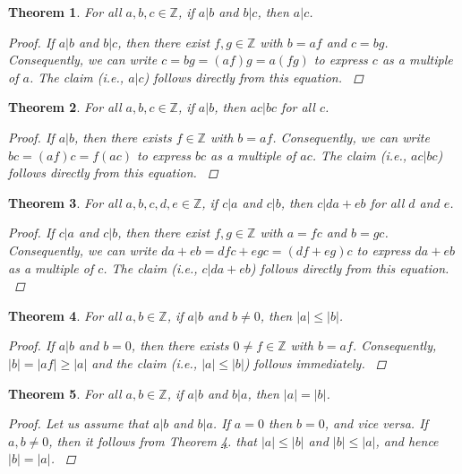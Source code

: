 \documentclass{book}
\newcommand{\ZZZ}{\ensuremath{\mathbb{Z}}}
\newtheorem{theo}{Theorem}
\begin{document}
\begin{theo}
For all $a,b,c\in\ZZZ$, if $a|b$ and $b|c$, then $a|c$.
\begin{proof}
If $a|b$ and $b|c$, then there exist $f,g\in\ZZZ$ with $b=af$ and $c=bg$. Consequently, we can write $c=bg= \left(af\right)g = a\left(fg\right)$ to express $c$ as a multiple of $a$. The claim (i.e., $a|c$) follows directly from this equation.
\cite{Oppliger:2011:CC:2049860}
\end{proof}
\end{theo}

\begin{theo}
For all $a,b,c\in\ZZZ$, if $a|b$, then $ac|bc$ for all $c$.
\begin{proof}
If $a|b$, then there exists $f\in\ZZZ$ with $b=af$. Consequently, we can write $bc=\left(af\right)c=f\left(ac\right)$ to express $bc$ as a multiple of $ac$. The claim (i.e., $ac|bc$) follows directly from this equation.
\cite{Oppliger:2011:CC:2049860}
\end{proof}
\end{theo}

\begin{theo}
For all $a,b,c,d,e\in\ZZZ$, if $c|a$ and $c|b$, then $c|da+eb$ for all $d$ and $e$.
\begin{proof}
If $c|a$ and $c|b$, then there exist $f,g\in\ZZZ$ with $a=fc$ and $b=gc$. Consequently, we can write $da+eb=dfc+egc=\left(df+eg\right)c$ to express $da+eb$ as a multiple of $c$. The claim (i.e., $c|da+eb$) follows directly from this equation.
\cite{Oppliger:2011:CC:2049860}
\end{proof}
\end{theo}

\begin{theo}
\label{theo4}
For all $a,b\in\ZZZ$, if $a|b$ and $b\neq0$, then $\left|a\right|\leq\left|b\right|$.
\begin{proof}
If $a|b$ and $b=0$, then there exists $0\neq f\in\ZZZ$ with $b=af$. Consequently, $\left|b\right|=\left|af\right|\geq\left|a\right|$ and the claim (i.e., $\left|a\right|\leq\left|b\right|$) follows immediately.
\cite{Oppliger:2011:CC:2049860}
\end{proof}
\end{theo}

\begin{theo}
For all $a,b\in\ZZZ$, if $a|b$ and $b|a$, then $\left|a\right|=\left|b\right|$.
\begin{proof}
Let us assume that $a|b$ and $b|a$. If $a=0$ then $b=0$, and vice versa. If $a,b\neq 0$, then it follows from Theorem \ref{theo4}. that $\left|a\right|\leq\left|b\right|$ and $\left|b\right|\leq\left|a\right|$, and hence $\left|b\right|=\left|a\right|$.
\cite{Oppliger:2011:CC:2049860}
\end{proof}
\end{theo}
\end{document}
